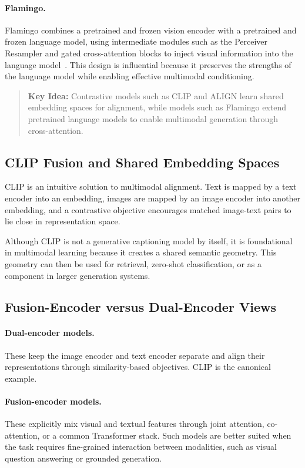 \documentclass{article}
\newenvironment{keyidea}{\begin{quote}\noindent\textbf{Key Idea:} }{\end{quote}}
\begin{document}
\paragraph{Flamingo.} Flamingo combines a pretrained and frozen vision encoder with a pretrained and frozen language model, using intermediate modules such as the Perceiver Resampler and gated cross-attention blocks to inject visual information into the language model~\cite{alayrac2022}. This design is influential because it preserves the strengths of the language model while enabling effective multimodal conditioning.

\begin{keyidea}
Contrastive models such as CLIP and ALIGN learn shared embedding spaces for alignment, while models such as Flamingo extend pretrained language models to enable multimodal generation through cross-attention.
\end{keyidea}

\subsection{CLIP Fusion and Shared Embedding Spaces}
CLIP is an intuitive solution to multimodal alignment. Text is mapped by a text encoder into an embedding, images are mapped by an image encoder into another embedding, and a contrastive objective encourages matched image-text pairs to lie close in representation space.

Although CLIP is not a generative captioning model by itself, it is foundational in multimodal learning because it creates a shared semantic geometry. This geometry can then be used for retrieval, zero-shot classification, or as a component in larger generation systems.

\subsection{Fusion-Encoder versus Dual-Encoder Views}

\paragraph{Dual-encoder models.} These keep the image encoder and text encoder separate and align their representations through similarity-based objectives. CLIP is the canonical example.

\paragraph{Fusion-encoder models.} These explicitly mix visual and textual features through joint attention, co-attention, or a common Transformer stack. Such models are better suited when the task requires fine-grained interaction between modalities, such as visual question answering or grounded generation.
\end{document}
